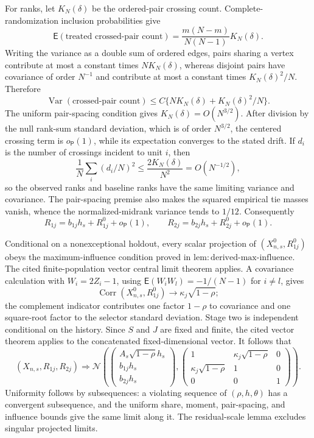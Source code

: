 For ranks, let \(K_N(\delta)\) be the ordered-pair crossing count.  Complete-randomization inclusion probabilities give
\[
\mathsf E(\text{treated crossed-pair count})
=\frac{m(N-m)}{N(N-1)}K_N(\delta).
\]
Writing the variance as a double sum of ordered edges, pairs sharing a vertex contribute at most a constant times \(NK_N(\delta)\), whereas disjoint pairs have covariance of order \(N^{-1}\) and contribute at most a constant times \(K_N(\delta)^2/N\).  Therefore
\[
\operatorname{Var}(\text{crossed-pair count})
\le C\{NK_N(\delta)+K_N(\delta)^2/N\}.
\]
The uniform pair-spacing condition gives \(K_N(\delta)=O(N^{3/2})\).  After division by the null rank-sum standard deviation, which is of order \(N^{3/2}\), the centered crossing term is \(o_{\mathsf P}(1)\), while its expectation converges to the stated drift.  If \(d_i\) is the number of crossings incident to unit \(i\), then
\[
\frac1N\sum_i(d_i/N)^2\le\frac{2K_N(\delta)}{N^2}=O(N^{-1/2}),
\]
so the observed ranks and baseline ranks have the same limiting variance and covariance.  The pair-spacing premise also makes the squared empirical tie masses vanish, whence the normalized-midrank variance tends to \(1/12\).  Consequently
\[
R_{1j}=b_{1j}h_s+R^0_{1j}+o_{\mathsf P}(1),
\qquad
R_{2j}=b_{2j}h_s+R^0_{2j}+o_{\mathsf P}(1).
\]

Conditional on a nonexceptional holdout, every scalar projection of \((X^0_{n,s},R^0_{1j})\) obeys the maximum-influence condition proved in \(\mathrm{lem{:}derived\mbox{-}max\mbox{-}influence}\).  The cited finite-population vector central limit theorem applies.  A covariance calculation with \(W_i=2Z_i-1\), using \(\mathsf E(W_iW_l)=-1/(N-1)\) for \(i\ne l\), gives
\[
\operatorname{Corr}(X^0_{n,s},R^0_{1j})
\longrightarrow\kappa_j\sqrt{1-\rho};
\]
the complement indicator contributes one factor \(1-\rho\) to covariance and one square-root factor to the selector standard deviation.  Stage two is independent conditional on the history.  Since \(S\) and \(J\) are fixed and finite, the cited vector theorem applies to the concatenated fixed-dimensional vector.  It follows that
\[
(X_{n,s},R_{1j},R_{2j})\Longrightarrow
\mathcal N\!\left(
\begin{pmatrix}A_s\sqrt{1-\rho}h_s\\b_{1j}h_s\\b_{2j}h_s\end{pmatrix},
\begin{pmatrix}
1&\kappa_j\sqrt{1-\rho}&0\\
\kappa_j\sqrt{1-\rho}&1&0\\
0&0&1
\end{pmatrix}
\right).
\]
Uniformity follows by subsequences: a violating sequence of \((\rho,h,\theta)\) has a convergent subsequence, and the uniform share, moment, pair-spacing, and influence bounds give the same limit along it.  The residual-scale lemma excludes singular projected limits.

